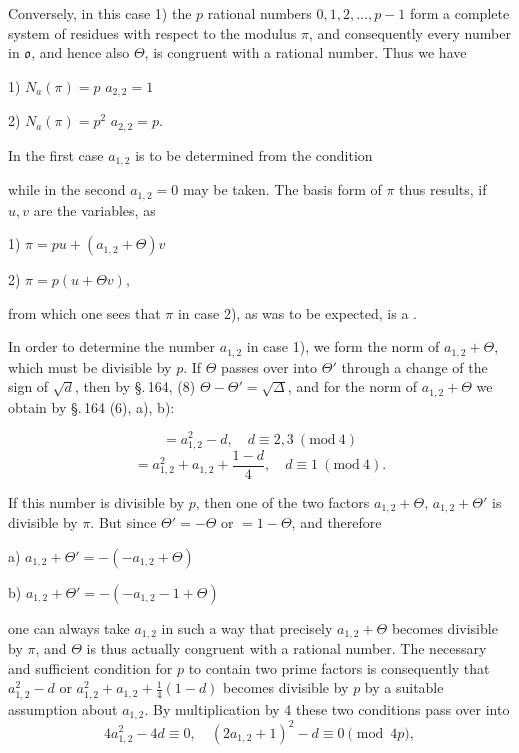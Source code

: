 Conversely, in this case 1) the $p$ rational numbers $0, 1, 2, \ldots, p-1$ form a complete system of residues with respect to the modulus $\pi$, and consequently every number in $\mathfrak{o}$, and hence also $\Theta$, is congruent with a rational number. Thus we have

1) \quad $N_a(\pi) = p$ \quad $a_{2,2} = 1$

2) \quad $N_a(\pi) = p^2$ \quad $a_{2,2} = p.$

In the first case $a_{1,2}$ is to be determined from the condition

while in the second $a_{1,2} = 0$ may be taken. The basis form of $\pi$ thus results, if $u, v$ are the variables, as

1) \quad $\pi = pu + (a_{1,2}+\Theta)v$

2) \quad $\pi = p(u+\Theta v),$

from which one sees that $\pi$ in case 2), as was to be expected, is a .

In order to determine the number $a_{1,2}$ in case 1), we form the norm of $a_{1,2}+\Theta$, which must be divisible by $p$. If $\Theta$ passes over into $\Theta'$ through a change of the sign of $\sqrt{d}$, then by \S.\,164, (8) $\Theta - \Theta' = \sqrt{\Delta}$, and for the norm of $a_{1,2}+\Theta$ we obtain by \S.\,164 (6), a), b):

\[ {} = a_{1,2}^2 - d, \quad d\equiv 2, 3\ (\mathrm{mod}\ 4) \]
\[ {} = a_{1,2}^2 + a_{1,2} + \frac{1-d}{4}, \quad d\equiv 1\ (\mathrm{mod}\ 4). \]

If this number is divisible by $p$, then one of the two factors $a_{1,2}+\Theta$, $a_{1,2}+\Theta'$ is divisible by $\pi$. But since $\Theta' = -\Theta$ or $=1-\Theta$, and therefore

a) \quad $a_{1,2} + \Theta' = -(-a_{1,2}+\Theta)$

b) \quad $a_{1,2} + \Theta' = -(-a_{1,2}-1+\Theta)$

one can always take $a_{1,2}$ in such a way that precisely $a_{1,2}+\Theta$ becomes divisible by $\pi$, and $\Theta$ is thus actually congruent with a rational number. The necessary and sufficient condition for $p$ to contain two prime factors is consequently that $a_{1,2}^2 - d$ or $a_{1,2}^2 + a_{1,2} + \frac14(1-d)$ becomes divisible by $p$ by a suitable assumption about $a_{1,2}$. By multiplication by 4 these two conditions pass over into
\[ 4a_{1,2}^2 - 4d \equiv 0, \quad (2a_{1,2}+1)^2 - d \equiv 0 \pmod{4p}, \]

